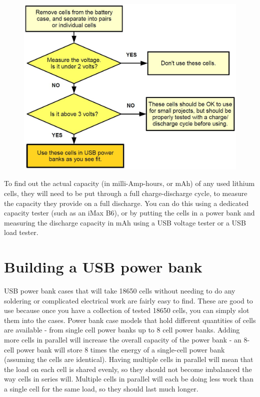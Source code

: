\documentclass{article}
\theoremstyle{definition}
\theoremstyle{definition}
\theoremstyle{remark}
\begin{document}
    \begin{figure}[!ht]
      \centering
      \includegraphics[width=0.75\paperwidth]{Images/image_5_5_(flowchart).png}
    \end{figure}

    To find out the actual capacity (in milli-Amp-hours, or mAh) of any used lithium cells, they will need to be put through a full charge-discharge cycle, to measure the capacity they provide on a full discharge. You can do this using a dedicated capacity tester (such as an iMax B6), or by putting the cells in a power bank and measuring the discharge capacity in mAh using a USB voltage tester or a USB load tester.
  


\section{Building a USB power bank} %
\label{sec:building_a_usb_power_bank}

  USB power bank cases that will take 18650 cells without needing to do any soldering or complicated electrical work are fairly easy to find. These are good to use because once you have a collection of tested 18650 cells, you can simply slot them into the cases. Power bank case models that hold different quantities of cells are available - from single cell power banks up to 8 cell power banks. Adding more cells in parallel will increase the overall capacity of the power bank - an 8-cell power bank will store 8 times the energy of a single-cell power bank (assuming the cells are identical). Having multiple cells in parallel will mean that the load on each cell is shared evenly, so they should not become imbalanced the way cells in series will. Multiple cells in parallel will each be doing less work than a single cell for the same load, so they should last much longer. 
\end{document}
